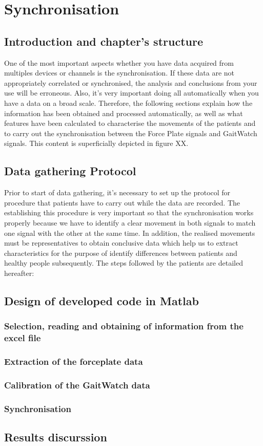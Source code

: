 \chapter{Synchronisation}
\label{ch:Synchronisation}

\section{Introduction and chapter's structure}
One of the most important aspects whether you have data acquired from multiples devices or channels is the synchronisation. If these data are not appropriately correlated or synchronised, the analysis and conclusions from your use will be erroneous. Also, it’s very important doing all automatically when you have a data on a broad scale.
Therefore, the following sections explain how the information has been obtained and processed automatically, as well as what features have been calculated to characterise the movements of the patients and to carry out the synchronisation between the Force Plate signals and GaitWatch signals. This content is superficially depicted in figure XX.

\section{Data gathering Protocol}
Prior to start of data gathering, it’s necessary to set up the protocol for procedure that patients have to carry out while the data are recorded. The establishing this procedure is very important so that the synchronisation works properly because we have to identify a clear movement in both signals to match one signal with the other at the same time.
In addition, the realised movements must be representatives to obtain conclusive data which help us to extract characteristics for the purpose of identify differences between patients and healthy people subsequently.
The steps followed by the patients are detailed hereafter:

\section{Design of developed code  in Matlab}
	\subsection{Selection, reading and obtaining of information from the excel file}
	\subsection{Extraction of the forceplate data}
	\subsection{Calibration of the GaitWatch data}
	\subsection{Synchronisation}	
\section{Results discurssion}